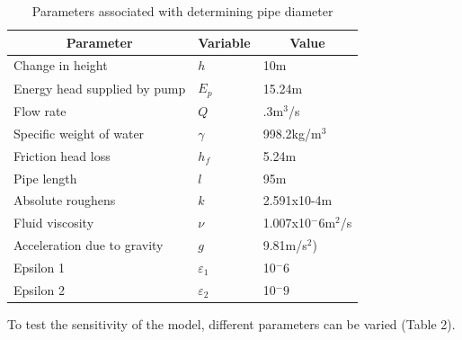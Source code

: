 \documentclass[titlepage,11pt]{article}
\begin{document}
\begin{table}[!h]
\caption{Parameters associated with determining pipe diameter}
\begin{center}
\begin{tabular}{|l|l|l|}\hline
\multicolumn{1}{|c|}{\bf Parameter} & \multicolumn{1}{c|}{\bf
Variable} & \multicolumn{1}{c|}{\bf Value} \\ \hline Change in
height
& $h$ & 10m \\ \hline Energy head supplied by pump & $E_p$ & 15.24m \\
\hline Flow rate & $Q$ & .3m$^3$/s \\ \hline Specific weight of
water &
$\gamma$ & 998.2kg/m$^3$ \\ \hline Friction head loss & $h_f$ & 5.24m \\
\hline Pipe length & $l$ & 95m \\ \hline Absolute roughens & $k$ &
2.591x10-4m \\ \hline Fluid viscosity & $\nu$ & 1.007x10$^-6$m$^2$/s \\
\hline Acceleration due to gravity & $g$ & 9.81m/s$^2$) \\ \hline
Epsilon 1 & $\varepsilon_1$ & 10$^-6$ \\ \hline Epsilon 2 & $\varepsilon_2$ & 10$^-9$ \\
\hline
\end{tabular}
\end{center}
\end{table}

\newpage To test the sensitivity of the model, different parameters can be
varied (Table 2).
\end{document}
